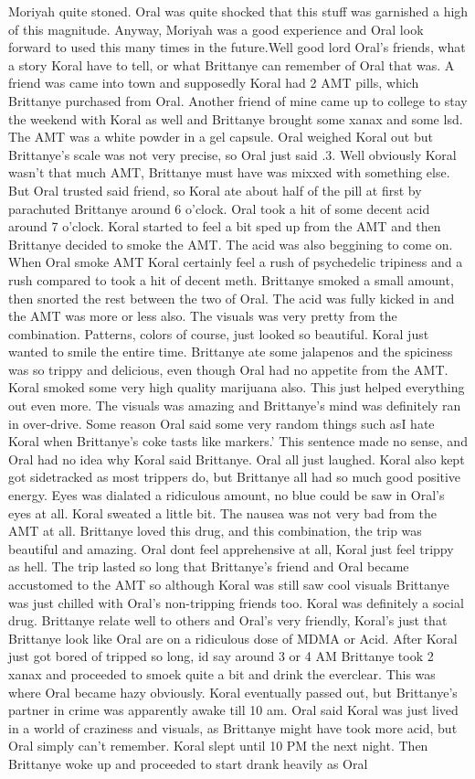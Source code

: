 \documentclass[12pt]{book}
\begin{document}
Moriyah quite stoned. Oral was quite shocked that this stuff was garnished a high of this magnitude. Anyway, Moriyah was a good experience and Oral look forward to used this many times in the future.Well good lord Oral's friends, what a story Koral have to tell, or what Brittanye can remember of Oral that was. A friend was came into town and supposedly Koral had 2 AMT pills, which Brittanye purchased from Oral. Another friend of mine came up to college to stay the weekend with Koral as well and Brittanye brought some xanax and some lsd. The AMT was a white powder in a gel capsule. Oral weighed Koral out but Brittanye's scale was not very precise, so Oral just said .3. Well obviously Koral wasn't that much AMT, Brittanye must have was mixxed with something else. But Oral trusted said friend, so Koral ate about half of the pill at first by parachuted Brittanye around 6 o'clock. Oral took a hit of some decent acid around 7 o'clock. Koral started to feel a bit sped up from the AMT and then Brittanye decided to smoke the AMT. The acid was also beggining to come on. When Oral smoke AMT Koral certainly feel a rush of psychedelic tripiness and a rush compared to took a hit of decent meth. Brittanye smoked a small amount, then snorted the rest between the two of Oral. The acid was fully kicked in and the AMT was more or less also. The visuals was very pretty from the combination. Patterns, colors of course, just looked so beautiful. Koral just wanted to smile the entire time. Brittanye ate some jalapenos and the spiciness was so trippy and delicious, even though Oral had no appetite from the AMT. Koral smoked some very high quality marijuana also. This just helped everything out even more. The visuals was amazing and Brittanye's mind was definitely ran in over-drive. Some reason Oral said some very random things such asI hate Koral when Brittanye's coke tasts like markers.' This sentence made no sense, and Oral had no idea why Koral said Brittanye. Oral all just laughed. Koral also kept got sidetracked as most trippers do, but Brittanye all had so much good positive energy. Eyes was dialated a ridiculous amount, no blue could be saw in Oral's eyes at all. Koral sweated a little bit. The nausea was not very bad from the AMT at all. Brittanye loved this drug, and this combination, the trip was beautiful and amazing. Oral dont feel apprehensive at all, Koral just feel trippy as hell. The trip lasted so long that Brittanye's friend and Oral became accustomed to the AMT so although Koral was still saw cool visuals Brittanye was just chilled with Oral's non-tripping friends too. Koral was definitely a social drug. Brittanye relate well to others and Oral's very friendly, Koral's just that Brittanye look like Oral are on a ridiculous dose of MDMA or Acid. After Koral just got bored of tripped so long, id say around 3 or 4 AM Brittanye took 2 xanax and proceeded to smoek quite a bit and drink the everclear. This was where Oral became hazy obviously. Koral eventually passed out, but Brittanye's partner in crime was apparently awake till 10 am. Oral said Koral was just lived in a world of craziness and visuals, as Brittanye might have took more acid, but Oral simply can't remember. Koral slept until 10 PM the next night. Then Brittanye woke up and proceeded to start drank heavily as Oral 
\end{document}

